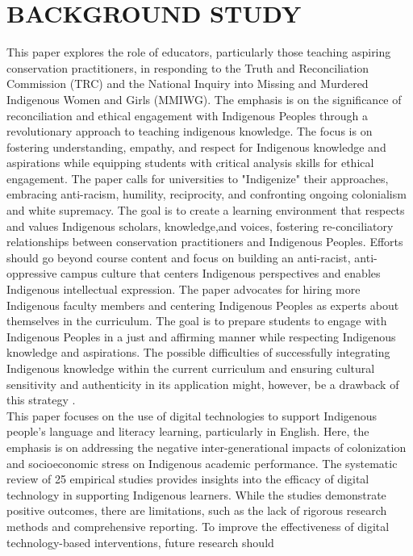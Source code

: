 \documentclass[a4paper,twoside]{article}
\begin{document}
\section{\uppercase{Background Study}}
\label{sec:Literature Review}
This paper explores the role of educators, particularly those teaching aspiring conservation practitioners, in responding to the Truth and Reconciliation Commission (TRC) and the National Inquiry into Missing and Murdered Indigenous Women and Girls (MMIWG). The emphasis is on the significance of reconciliation and ethical engagement with Indigenous Peoples through a revolutionary approach to teaching indigenous knowledge. The focus is on fostering understanding, empathy, and respect for Indigenous knowledge and aspirations while equipping students with critical analysis skills for ethical engagement. The paper calls for universities to "Indigenize" their approaches, embracing anti-racism, humility, reciprocity, and confronting ongoing colonialism and white supremacy. The goal is to create a learning environment that respects and values Indigenous scholars, knowledge,and voices, fostering re-conciliatory relationships between conservation practitioners and Indigenous Peoples. Efforts should go beyond course content and focus on building an anti-racist, anti-oppressive campus culture that
centers Indigenous perspectives and enables Indigenous intellectual expression. The paper advocates for hiring more Indigenous faculty members and centering Indigenous Peoples as experts about themselves in the curriculum. The goal is to prepare students to engage with Indigenous Peoples in a just and affirming manner while respecting Indigenous knowledge and aspirations. The possible difficulties of successfully integrating Indigenous knowledge within the current curriculum and ensuring cultural sensitivity and authenticity in its application might, 
 however, be a drawback of this strategy \cite{Wu19}.
\\This paper focuses on the use of digital technologies to support Indigenous people’s language and literacy learning, particularly in English. Here, the emphasis is on addressing the negative inter-generational impacts of colonization and socioeconomic stress on Indigenous academic performance. The systematic review of 25 empirical studies provides insights into the efficacy of digital technology in supporting Indigenous learners. While the studies demonstrate positive outcomes, there are limitations, such as the lack of rigorous research methods and comprehensive reporting. To improve the effectiveness
of digital technology-based interventions, future research should
\end{document}
